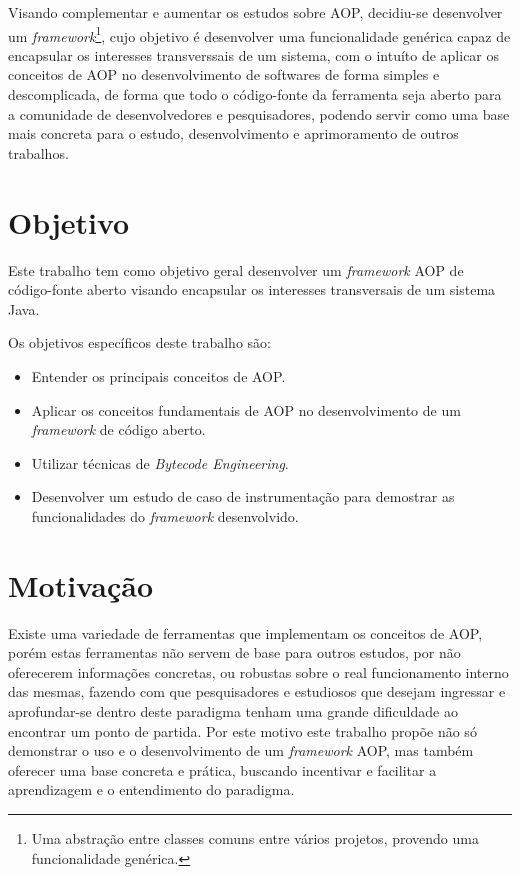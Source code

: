 \documentclass[tc,oneside]{iiufrgs}
\begin{document}
Visando complementar e aumentar os estudos sobre AOP, decidiu-se desenvolver um \textit{framework}\footnote{Uma abstração entre classes comuns entre vários projetos, provendo uma funcionalidade genérica.}, cujo objetivo é desenvolver uma funcionalidade genérica capaz de encapsular os interesses transverssais de um sistema, com o intuíto de aplicar os conceitos de AOP no desenvolvimento de softwares de forma simples e descomplicada, de forma que todo o código-fonte da ferramenta seja aberto para a comunidade de desenvolvedores e pesquisadores, podendo servir como uma base mais concreta para o estudo, desenvolvimento e aprimoramento de outros trabalhos.

\section{Objetivo}
Este trabalho tem como objetivo geral desenvolver um \textit{framework} AOP de código-fonte aberto visando encapsular os interesses transversais de um sistema Java.

Os objetivos específicos deste trabalho são: 

\begin{itemize}
\item Entender os principais conceitos de AOP.
\item Aplicar os conceitos fundamentais de AOP no desenvolvimento de um \textit{framework} de código aberto.
\item Utilizar técnicas de \textit{Bytecode Engineering}.
\item Desenvolver um estudo de caso de instrumentação para demostrar as funcionalidades do \textit{framework} desenvolvido.
\end{itemize}

\section{Motivação}

Existe uma variedade de ferramentas que implementam os conceitos de AOP, porém estas ferramentas não servem de base para outros estudos, por não oferecerem informações concretas, ou robustas sobre o real funcionamento interno das mesmas, fazendo com que pesquisadores e estudiosos que desejam ingressar e aprofundar-se dentro deste paradigma tenham uma grande dificuldade ao encontrar um ponto de partida. Por este motivo este trabalho propõe não só demonstrar o uso e o desenvolvimento de um \textit{framework} AOP, mas também oferecer uma base concreta e prática, buscando incentivar e facilitar a aprendizagem e o entendimento do paradigma.
\end{document}
